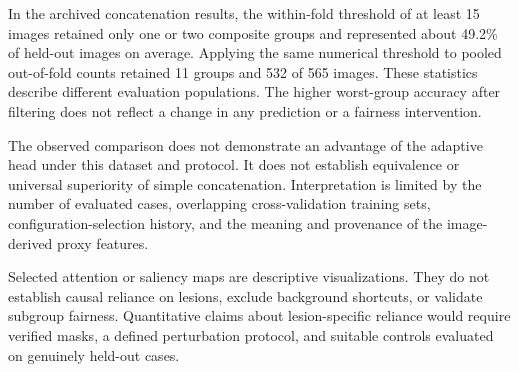 In the archived concatenation results, the within-fold threshold of at least
15 images retained only one or two composite groups and represented about
49.2\% of held-out images on average. Applying the same numerical threshold to
pooled out-of-fold counts retained 11 groups and 532 of 565 images. These
statistics describe different evaluation populations. The higher worst-group
accuracy after filtering does not reflect a change in any prediction or a
fairness intervention.

The observed comparison does not demonstrate an advantage of the adaptive
head under this dataset and protocol. It does not establish equivalence or
universal superiority of simple concatenation. Interpretation is limited by
the number of evaluated cases, overlapping cross-validation training sets,
configuration-selection history, and the meaning and provenance of the
image-derived proxy features.

Selected attention or saliency maps are descriptive visualizations. They do
not establish causal reliance on lesions, exclude background shortcuts, or
validate subgroup fairness. Quantitative claims about lesion-specific reliance
would require verified masks, a defined perturbation protocol, and suitable
controls evaluated on genuinely held-out cases.
